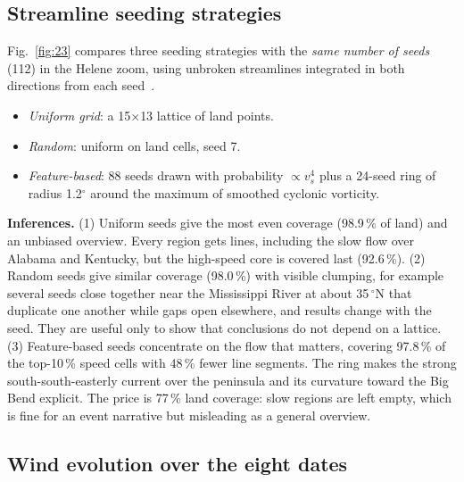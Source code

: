 \subsection{Streamline seeding strategies}
Fig.~\ref{fig:23} compares three seeding strategies with the \emph{same number of seeds} (112) in the Helene zoom, using
unbroken streamlines integrated in both directions from each seed~\cite{turk1996,jobard1997}.
\begin{itemize}
\item \emph{Uniform grid}: a 15$\times$13 lattice of land points.
\item \emph{Random}: uniform on land cells, seed 7.
\item \emph{Feature-based}: 88 seeds drawn with probability $\propto v_s^4$ plus a 24-seed ring of radius 1.2$^\circ$
  around the maximum of smoothed cyclonic vorticity.
\end{itemize}


\textbf{Inferences.}
(1) Uniform seeds give the most even coverage (98.9\,\% of land) and an unbiased overview. Every region gets lines, including
the slow flow over Alabama and Kentucky, but the high-speed core is covered last (92.6\,\%).
(2) Random seeds give similar coverage (98.0\,\%) with visible clumping, for example several seeds close together near the Mississippi River at about 35\,$^\circ$N
that duplicate one another while gaps open elsewhere, and results change with the seed. They are useful only to show that
conclusions do not depend on a lattice.
(3) Feature-based seeds concentrate on the flow that matters, covering 97.8\,\% of the top-10\,\% speed cells with 48\,\% fewer
line segments. The ring makes the strong south-south-easterly current over the peninsula and its curvature toward the Big
Bend explicit. The price is 77\,\% land coverage: slow regions are left empty, which is fine for an event narrative but
misleading as a general overview.

\subsection{Wind evolution over the eight dates}


